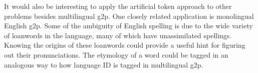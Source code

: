 \documentclass[11pt,letterpaper]{article}
\begin{document}
It would also be interesting to apply the artificial token approach to other problems besides multilingual g2p. One closely related application is monolingual English g2p. Some of the ambiguity of English spelling is due to the wide variety of loanwords in the language, many of which have unassimilated spellings. Knowing the origins of these loanwords could provide a useful hint for figuring out their pronunciations. The etymology of a word could be tagged in an analogous way to how language ID is tagged in multilingual g2p.



\end{document}
